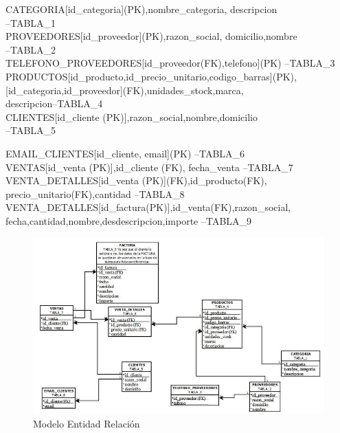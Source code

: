 \documentclass[10pt]{report}
\begin{document}
\begin{flushleft} \ttfamily
\setlength{\parskip}{0mm}

CATEGORIA{[id\_categoria](PK),nombre\_categoria, descripcion}\\ --TABLA\_1\\

PROVEEDORES{[id\_proveedor](PK),razon\_social, domicilio,nombre}\\ --TABLA\_2\\

TELEFONO\_PROVEEDORES{[id\_proveedor(FK),telefono](PK)} --TABLA\_3\\

PRODUCTOS{[id\_producto,id\_precio\_unitario,codigo\_barras](PK),
[id\_categoria,id\_proveedor](FK),unidades\_stock,marca,\\
descripcion}--TABLA\_4\\

CLIENTES{[id\_cliente (PK)],razon\_social,nombre,domicilio}\\ --TABLA\_5

EMAIL\_CLIENTES{[id\_cliente, email](PK)} --TABLA\_6\\

VENTAS{[id\_venta (PK)],id\_cliente (FK), fecha\_venta} --TABLA\_7\\

VENTA\_DETALLES{[id\_venta (PK)](FK),id\_producto(FK),\\ precio\_unitario(FK),cantidad} --TABLA\_8\\
VENTA\_DETALLES{[id\_factura(PK)],id\_venta(FK),razon\_social,\\
fecha,cantidad,nombre,desdescripcion,importe} --TABLA\_9\\


\end{flushleft}

 
    
   \begin{figure}[htb]
    \centering
    \includegraphics[width=0.9\linewidth]{MER.png}
    \caption{Modelo Entidad Relación}
    \end{figure}
\end{document}
